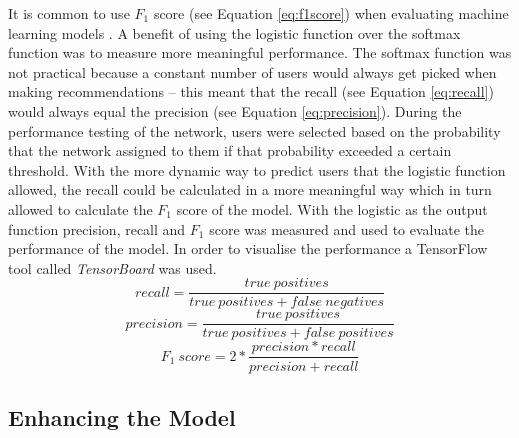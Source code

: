 It is common to use $F_1$ score (see Equation \ref{eq:f1score}) when evaluating machine learning models \parencite{yang1999re}. A benefit of using the logistic function over the softmax function was to measure more meaningful performance. The softmax function was not practical because a constant number of users would always get picked when making recommendations -- this meant that the recall (see Equation \ref{eq:recall}) would always equal the precision (see Equation \ref{eq:precision}). During the performance testing of the network, users were selected based on the probability that the network assigned to them if that probability exceeded a certain threshold. With the more dynamic way to predict users that the logistic function allowed, the recall could be calculated in a more meaningful way which in turn allowed to calculate the $F_1$ score of the model. With the logistic as the output function precision, recall and $F_1$ score was measured and used to evaluate the performance of the model. In order to visualise the performance a TensorFlow tool called \textit{TensorBoard} was used.
\begin{equation}
    \label{eq:recall}
    recall = \frac{true\ positives}{true\ positives + false\ negatives}
\end{equation}
\begin{equation}
    \label{eq:precision}
    precision = \frac{true\ positives}{true\ positives + false\ positives}
\end{equation}
\begin{equation}
    \label{eq:f1score}
    F_1\ score = 2 * \frac{precision * recall}{precision + recall}
\end{equation}
\subsection{Enhancing the Model}\label{sect:enhacing_the_model}

